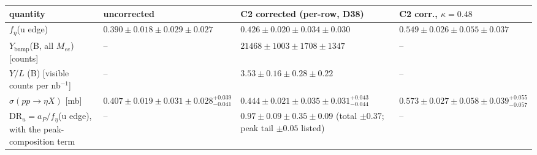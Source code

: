\begin{tabular}{llll}
\hline
 quantity & uncorrected & C2 corrected (per-row, D38) & C2 corr., $\kappa=0.48$ \\
\hline
 $f_\eta$(u edge) & $0.390\pm0.018\pm0.029\pm0.027$ & $0.426\pm0.020\pm0.034\pm0.030$ & $0.549\pm0.026\pm0.055\pm0.037$ \\
 $Y_{\mathrm{bump}}$(B, all $M_{ee}$) [counts] & -- & $21468\pm1003\pm1708\pm1347$ & -- \\
 $Y/L$ (B) [visible counts per nb$^{-1}$] & -- & $3.53\pm0.16\pm0.28\pm0.22$ & -- \\
 $\sigma(pp\to\eta X)$ [mb] & $0.407\pm0.019\pm0.031\pm0.028^{+0.039}_{-0.041}$ & $0.444\pm0.021\pm0.035\pm0.031^{+0.043}_{-0.044}$ & $0.573\pm0.027\pm0.058\pm0.039^{+0.055}_{-0.057}$ \\
 DR$_u=a_P/f_\eta$(u edge), with the peak-composition term & -- & $0.97\pm0.09\pm0.35\pm0.09$ (total $\pm0.37$; peak tail $\pm0.05$ listed) & -- \\
\hline
\end{tabular}
